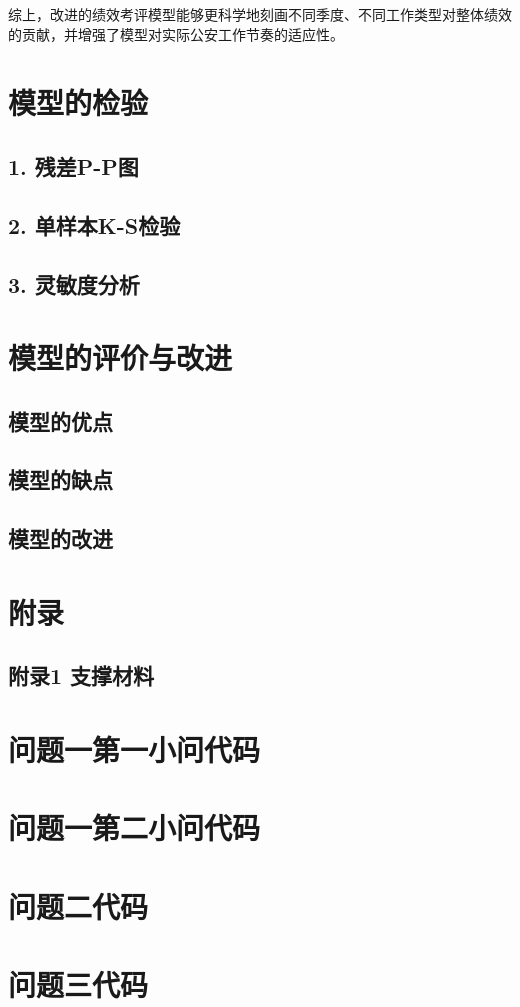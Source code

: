 \documentclass[12pt]{ctexart}
\begin{document}
	综上，改进的绩效考评模型能够更科学地刻画不同季度、不同工作类型对整体绩效的贡献，并增强了模型对实际公安工作节奏的适应性。
	
	\newpage
	\section{模型的检验}
	\subsection*{1. 残差P-P图}
	\subsection*{2. 单样本K-S检验}
	\subsection*{3. 灵敏度分析}
	
	\section{模型的评价与改进}
	\subsection{模型的优点}
	\subsection{模型的缺点}
	\subsection{模型的改进}
	
	\newpage
	\begin{thebibliography}{9}
		
	\end{thebibliography}
	
	\newpage
	\section*{附录}
	\subsection*{附录1 支撑材料}
	
	\newpage
	\section{问题一第一小问代码}
	
	\section{问题一第二小问代码}
	
	\section{问题二代码}
	
	\section{问题三代码}
	
	
	
\end{document}

